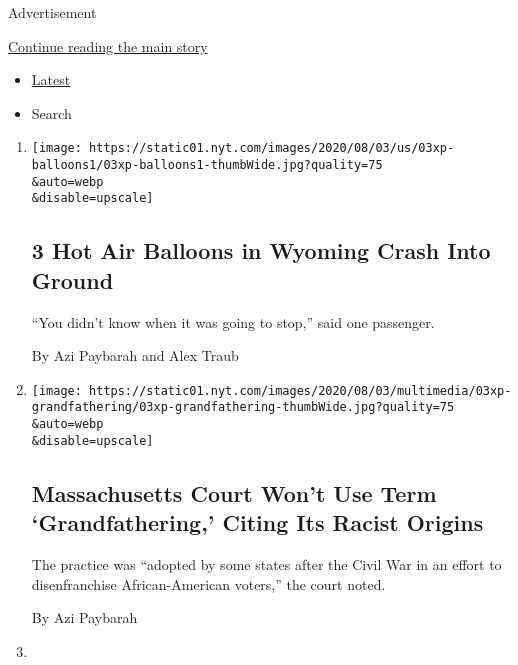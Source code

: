 Advertisement

\protect\hyperlink{after-mid1}{Continue reading the main story}

\begin{itemize}
\tightlist
\item
  \protect\hyperlink{stream-panel}{Latest}
\item
  Search
\end{itemize}

\begin{enumerate}
\def\labelenumi{\arabic{enumi}.}
\item
  \href{/2020/08/04/us/wyoming-hot-air-balloons-crash.html}{}

  \texttt{[image: https://static01.nyt.com/images/2020/08/03/us/03xp-balloons1/03xp-balloons1-thumbWide.jpg?quality=75\\\&auto=webp\\\&disable=upscale]}

  \hypertarget{3-hot-air-balloons-in-wyoming-crash-into-ground}{%
  \subsection{3 Hot Air Balloons in Wyoming Crash Into
  Ground}\label{3-hot-air-balloons-in-wyoming-crash-into-ground}}

  ``You didn't know when it was going to stop,'' said one passenger.

  By Azi Paybarah and Alex Traub
\item
  \href{/2020/08/03/us/racism-massachusetts-grandfathering.html}{}

  \texttt{[image: https://static01.nyt.com/images/2020/08/03/multimedia/03xp-grandfathering/03xp-grandfathering-thumbWide.jpg?quality=75\\\&auto=webp\\\&disable=upscale]}

  \hypertarget{massachusetts-court-wont-use-term-grandfathering-citing-its-racist-origins}{%
  \subsection{Massachusetts Court Won't Use Term `Grandfathering,'
  Citing Its Racist
  Origins}\label{massachusetts-court-wont-use-term-grandfathering-citing-its-racist-origins}}

  The practice was ``adopted by some states after the Civil War in an
  effort to disenfranchise African-American voters,'' the court noted.

  By Azi Paybarah
\item
  \href{/2020/08/03/us/politics/merritt-corrigan-usaid.html}{}


\end{enumerate}
